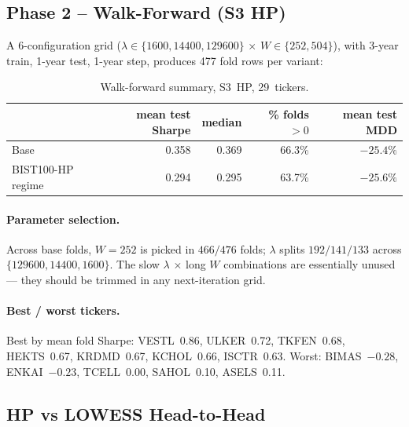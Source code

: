 \documentclass[11pt,a4paper]{article}
\begin{document}
\subsection{Phase 2 -- Walk-Forward (S3 HP)}

A 6-configuration grid (\(\lambda\!\in\!\{1600,14400,129600\}\) \(\times\)
\(W\!\in\!\{252,504\}\)), with 3-year train, 1-year test, 1-year step,
produces 477 fold rows per variant:

\begin{table}[h]
\centering
\begin{tabular}{@{}lrrrr@{}}
\toprule
& \textbf{mean test Sharpe} & \textbf{median} & \textbf{\% folds $>0$} & \textbf{mean test MDD} \\
\midrule
Base               & 0.358 & 0.369 & 66.3\% & $-25.4\%$ \\
BIST100-HP regime  & 0.294 & 0.295 & 63.7\% & $-25.6\%$ \\
\bottomrule
\end{tabular}
\caption{Walk-forward summary, S3~HP, 29~tickers.}
\end{table}

\paragraph{Parameter selection.} Across base folds, $W{=}252$ is picked in
$466/476$ folds; $\lambda$ splits $192 / 141 / 133$ across
$\{129600, 14400, 1600\}$. The slow $\lambda$ $\times$ long $W$
combinations are essentially unused --- they should be trimmed in any
next-iteration grid.

\paragraph{Best / worst tickers.} Best by mean fold Sharpe: VESTL~0.86,
ULKER~0.72, TKFEN~0.68, HEKTS~0.67, KRDMD~0.67, KCHOL~0.66, ISCTR~0.63.
Worst: BIMAS~$-0.28$, ENKAI~$-0.23$, TCELL~0.00, SAHOL~0.10, ASELS~0.11.

\subsection{HP vs LOWESS Head-to-Head}\label{sec:results-h2h}
\end{document}
